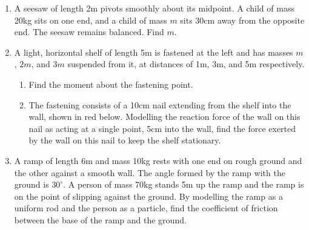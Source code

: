 \documentclass{article}
\begin{document}
\begin{enumerate}
	\item A seesaw of length 2m pivots smoothly about its midpoint. A child of mass 20kg sits on one end, and a child of mass $m$ sits 30cm away from the opposite end. The seesaw remains balanced. Find $m$.
	\item A light, horizontal shelf of length 5m is fastened at the left and has masses $m$, $2m$, and $3m$ suspended from it, at distances of 1m, 3m, and 5m respectively.
		\begin{enumerate}
			\item Find the moment about the fastening point.
			\item The fastening consists of a 10cm nail extending from the shelf into the wall, shown in red below. Modelling the reaction force of the wall on this nail as acting at a single point, 5cm into the wall, find the force exerted by the wall on this nail to keep the shelf stationary.
		\end{enumerate}
		\begin{center}
		\end{center}
	\item A ramp of length 6m and mass 10kg rests with one end on rough ground and the other against a smooth wall. The angle formed by the ramp with the ground is $30^\circ$. A person of mass 70kg stands 5m up the ramp and the ramp is on the point of slipping against the ground. By modelling the ramp as a uniform rod and the person as a particle, find the coefficient of friction between the base of the ramp and the ground.
\end{enumerate}
\end{document}
